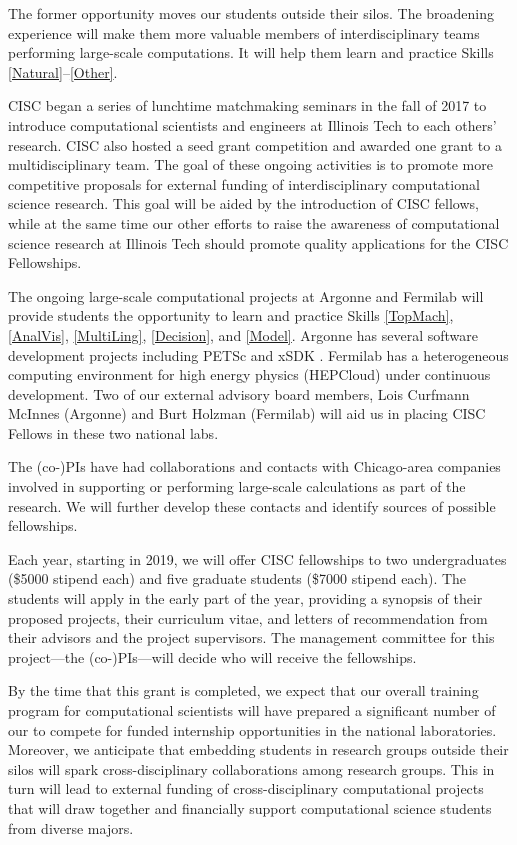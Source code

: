 \documentclass[11pt]{NSFamsart}
\begin{document}
The former opportunity moves our students outside their silos.  The broadening experience will make them more valuable members of interdisciplinary teams performing large-scale computations.  It will help them learn and practice Skills \ref{Natural}--\ref{Other}.  

CISC began a series of lunchtime matchmaking seminars in the fall of 2017 to introduce computational scientists and engineers at Illinois Tech to each others' research.  CISC also hosted a seed grant competition and awarded one grant to a multidisciplinary team.  The goal of these ongoing activities is to promote more competitive proposals for external funding of interdisciplinary computational science research.  This goal will be aided by the introduction of CISC fellows, while at the same time our other efforts to raise the awareness of computational science research at Illinois Tech should promote quality applications for the CISC Fellowships.

The ongoing large-scale computational projects at Argonne and Fermilab will provide students the opportunity to learn and practice Skills \ref{TopMach}, \ref{AnalVis}, \ref{MultiLing}, \ref{Decision}, and \ref{Model}.  Argonne has several software development projects including PETSc \cite{petsc-web-page17} and xSDK \cite{XSDK17a}. Fermilab has a heterogeneous computing environment for high energy physics (HEPCloud) \cite{HEP18a} under continuous development.  Two of our external advisory board members, Lois Curfmann McInnes (Argonne) and Burt Holzman (Fermilab) will aid us in placing CISC Fellows in these two national labs.

The (co-)PIs have had collaborations and contacts with Chicago-area companies involved in supporting or performing large-scale calculations as part of the research.  We will further develop these contacts and identify sources of possible fellowships.

Each year, starting in 2019, we will offer CISC fellowships to two undergraduates (\$5000 stipend each) and five graduate students (\$7000 stipend each).  The students will apply in the early part of the year, providing a synopsis of their proposed projects, their curriculum vitae, and letters of recommendation from their advisors and the project supervisors.  The management committee for this project---the (co-)PIs---will decide who will receive the fellowships.  

By the time that this grant is completed, we expect that our overall training program for computational scientists will have prepared a significant number of our to compete for funded internship opportunities in the national laboratories.  Moreover, we anticipate that embedding  students in research groups outside their silos will spark cross-disciplinary collaborations among research groups.  This in turn will lead to external funding of cross-disciplinary computational projects that will draw together and financially support computational science students from diverse majors.
\end{document}
